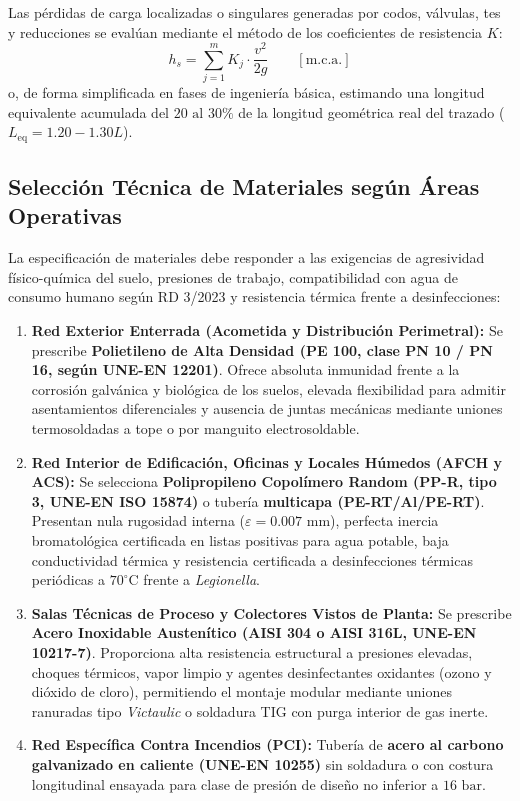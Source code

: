 \documentclass{report}
\begin{document}
Las pérdidas de carga localizadas o singulares generadas por codos, válvulas, tes y reducciones se evalúan mediante el método de los coeficientes de resistencia $K$:
\begin{equation}
    h_s = \sum_{j=1}^{m} K_j \cdot \frac{v^2}{2g} \qquad [\text{m.c.a.}]
    \label{eq:perdidas_singulares}
\end{equation}
o, de forma simplificada en fases de ingeniería básica, estimando una longitud equivalente acumulada del $20\text{ al }30\%$ de la longitud geométrica real del trazado ($L_{\text{eq}} = 1.20 - 1.30 L$).

\subsection{Selección Técnica de Materiales según Áreas Operativas}

La especificación de materiales debe responder a las exigencias de agresividad físico-química del suelo, presiones de trabajo, compatibilidad con agua de consumo humano según RD 3/2023 y resistencia térmica frente a desinfecciones:

\begin{enumerate}
    \item \textbf{Red Exterior Enterrada (Acometida y Distribución Perimetral):}
          Se prescribe \textbf{Polietileno de Alta Densidad (PE 100, clase PN 10 / PN 16, según UNE-EN 12201)}. Ofrece absoluta inmunidad frente a la corrosión galvánica y biológica de los suelos, elevada flexibilidad para admitir asentamientos diferenciales y ausencia de juntas mecánicas mediante uniones termosoldadas a tope o por manguito electrosoldable.
    \item \textbf{Red Interior de Edificación, Oficinas y Locales Húmedos (AFCH y ACS):}
          Se selecciona \textbf{Polipropileno Copolímero Random (PP-R, tipo 3, UNE-EN ISO 15874)} o tubería \textbf{multicapa (PE-RT/Al/PE-RT)}. Presentan nula rugosidad interna ($\varepsilon = 0.007\text{ mm}$), perfecta inercia bromatológica certificada en listas positivas para agua potable, baja conductividad térmica y resistencia certificada a desinfecciones térmicas periódicas a $70^\circ\text{C}$ frente a \textit{Legionella}.
    \item \textbf{Salas Técnicas de Proceso y Colectores Vistos de Planta:}
          Se prescribe \textbf{Acero Inoxidable Austenítico (AISI 304 o AISI 316L, UNE-EN 10217-7)}. Proporciona alta resistencia estructural a presiones elevadas, choques térmicos, vapor limpio y agentes desinfectantes oxidantes (ozono y dióxido de cloro), permitiendo el montaje modular mediante uniones ranuradas tipo \textit{Victaulic} o soldadura TIG con purga interior de gas inerte.
    \item \textbf{Red Específica Contra Incendios (PCI):}
          Tubería de \textbf{acero al carbono galvanizado en caliente (UNE-EN 10255)} sin soldadura o con costura longitudinal ensayada para clase de presión de diseño no inferior a $16\text{ bar}$.
\end{enumerate}
\end{document}
